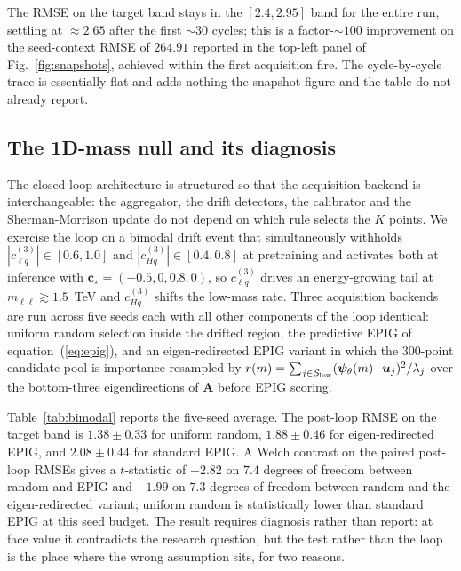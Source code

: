 \documentclass[11pt,a4paper]{article}
\newcommand{\mll}{m_{\ell\ell}}
\newcommand{\psib}{\bm{\psi}}
\begin{document}
The RMSE on the target band stays in the $[2.4, 2.95]$ band for the entire run, settling at $\approx 2.65$ after the first $\sim 30$ cycles; this is a factor-$\sim\!100$ improvement on the seed-context RMSE of $264.91$ reported in the top-left panel of Fig.~\ref{fig:snapshots}, achieved within the first acquisition fire. The cycle-by-cycle trace is essentially flat and adds nothing the snapshot figure and the table do not already report.

\subsection{The 1D-mass null and its diagnosis}
\label{sec:bimodal-epig}

The closed-loop architecture is structured so that the acquisition backend is interchangeable: the aggregator, the drift detectors, the calibrator and the Sherman-Morrison update do not depend on which rule selects the $K$ points. We exercise the loop on a bimodal drift event that simultaneously withholds $|c_{\ell q}^{(3)}| \in [0.6, 1.0]$ and $|c_{Hq}^{(3)}| \in [0.4, 0.8]$ at pretraining and activates both at inference with $\bm{c}_\star = (-0.5, 0, 0.8, 0)$, so $c_{\ell q}^{(3)}$ drives an energy-growing tail at $\mll \gtrsim 1.5$~TeV and $c_{Hq}^{(3)}$ shifts the low-mass rate. Three acquisition backends are run across five seeds each with all other components of the loop identical: uniform random selection inside the drifted region, the predictive EPIG of equation~(\ref{eq:epig}), and an eigen-redirected EPIG variant in which the $300$-point candidate pool is importance-resampled by $r(m) = \sum_{j \in \mathcal{S}_{\rm low}} (\psib_\theta(m) \cdot \bm{u}_j)^2 / \lambda_j$ over the bottom-three eigendirections of $\bm{A}$ before EPIG scoring.

Table~\ref{tab:bimodal} reports the five-seed average. The post-loop RMSE on the target band is $1.38 \pm 0.33$ for uniform random, $1.88 \pm 0.46$ for eigen-redirected EPIG, and $2.08 \pm 0.44$ for standard EPIG. A Welch contrast on the paired post-loop RMSEs gives a $t$-statistic of $-2.82$ on $7.4$ degrees of freedom between random and EPIG and $-1.99$ on $7.3$ degrees of freedom between random and the eigen-redirected variant; uniform random is statistically lower than standard EPIG at this seed budget. The result requires diagnosis rather than report: at face value it contradicts the research question, but the test rather than the loop is the place where the wrong assumption sits, for two reasons.
\end{document}
